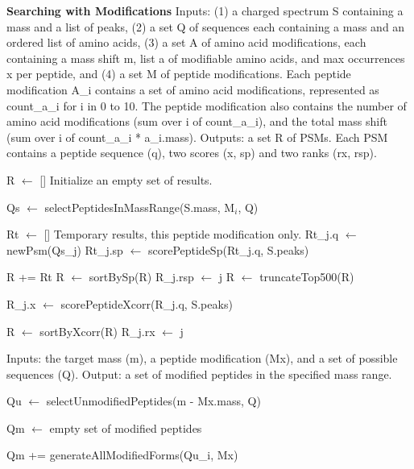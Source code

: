 \documentclass[12pt]{article}
\begin{document}
\begin{algorithm}
\caption{{\bf Searching with Modifications} Inputs: (1) a charged
  spectrum S containing a mass and a list of peaks, (2) a set Q of
  sequences each containing a mass and an ordered list of amino acids,
  (3) a set A of amino acid modifications, each containing a mass
  shift m, list a of modifiable amino acids, and max occurrences x per
  peptide, and (4) a set M of peptide modifications.  Each peptide
  modification A\_i contains a set of amino acid modifications,
  represented as count\_a\_i for i in 0 to 10.  The peptide
  modification also contains the number of amino acid modifications
  (sum over i of count\_a\_i), and the total mass shift (sum over i of
  count\_a\_i * a\_i.mass). Outputs: a set R of PSMs.  Each PSM
  contains a peptide sequence (q), two scores (x, sp) and two ranks
  (rx, rsp).}

\begin{algorithmic}[1]

\State R $\gets$ []
\Comment Initialize an empty set of results.

   \State Qs $\gets$ selectPeptidesInMassRange(S.mass, M$_i$, Q)

   \State Rt $\gets$ []
   \Comment Temporary results, this peptide modification only.
     \State Rt\_j.q $\gets$ newPsm(Qs\_j)
     \State Rt\_j.sp $\gets$ scorePeptideSp(Rt\_j.q, S.peaks)
   \EndFor

   \State R += Rt
   \State R $\gets$ sortBySp(R)
     \State R\_j.rsp $\gets$ j
   \EndFor
   \State R $\gets$ truncateTop500(R)

     \State R\_j.x $\gets$ scorePeptideXcorr(R\_j.q, S.peaks)
   \EndFor

   \State R $\gets$ sortByXcorr(R)
     \State R\_j.rx $\gets$ j
   \EndFor

\EndFor

\State {}
\EndProcedure
\end{algorithmic}
\end{algorithm}

\begin{algorithm}
\caption{ Inputs: the target mass (m), a peptide modification (Mx),
  and a set of possible sequences (Q).  Output: a set of modified
  peptides in the specified mass range.}

\begin{algorithmic}[1]
  \State Qu $\gets$ selectUnmodifiedPeptides(m - Mx.mass, Q)
   
  \State Qm $\gets$ empty set of modified peptides

      \State Qm += generateAllModifiedForms(Qu\_i, Mx)
    \EndIf
  \EndFor

  \State {}
\EndProcedure
\end{algorithmic}
\end{algorithm}
\end{document}
